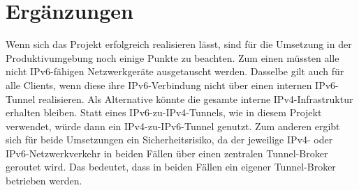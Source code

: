 \section{Ergänzungen}



Wenn sich das Projekt erfolgreich realisieren lässt, sind für die Umsetzung in der Produktivumgebung noch einige Punkte zu beachten. Zum einen müssten alle nicht IPv6-fähigen Netzwerkgeräte ausgetauscht werden. Dasselbe gilt auch für alle Clients, wenn diese ihre IPv6-Verbindung nicht über einen internen IPv6-Tunnel realisieren. Als Alternative könnte die gesamte interne IPv4-Infrastruktur erhalten bleiben. Statt eines IPv6-zu-IPv4-Tunnels, wie in diesem Projekt verwendet, würde dann ein IPv4-zu-IPv6-Tunnel genutzt. Zum anderen ergibt sich für beide Umsetzungen ein Sicherheitsrisiko, da der jeweilige IPv4- oder IPv6-Netzwerkverkehr in beiden Fällen über einen zentralen Tunnel-Broker geroutet wird. Das bedeutet, dass in beiden Fällen ein eigener Tunnel-Broker betrieben werden.